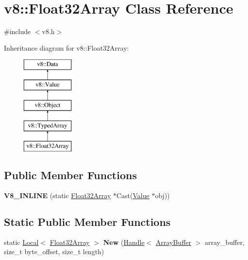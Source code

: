 \hypertarget{classv8_1_1_float32_array}{}\section{v8\+:\+:Float32\+Array Class Reference}
\label{classv8_1_1_float32_array}


{\ttfamily \#include $<$v8.\+h$>$}

Inheritance diagram for v8\+:\+:Float32\+Array\+:\begin{figure}[H]
\begin{center}
\leavevmode
\includegraphics[height=5.000000cm]{classv8_1_1_float32_array}
\end{center}
\end{figure}
\subsection*{Public Member Functions}
\begin{DoxyCompactItemize}
\item 
\hypertarget{classv8_1_1_float32_array_a954944ab47d5da9b67025ac40902a6f7}{}{\bfseries V8\+\_\+\+I\+N\+L\+I\+N\+E} (static \hyperlink{classv8_1_1_float32_array}{Float32\+Array} $\ast$Cast(\hyperlink{classv8_1_1_value}{Value} $\ast$obj))\label{classv8_1_1_float32_array_a954944ab47d5da9b67025ac40902a6f7}

\end{DoxyCompactItemize}
\subsection*{Static Public Member Functions}
\begin{DoxyCompactItemize}
\item 
\hypertarget{classv8_1_1_float32_array_a6fea1d1987ec9abce97060900d5fc4af}{}static \hyperlink{classv8_1_1_local}{Local}$<$ \hyperlink{classv8_1_1_float32_array}{Float32\+Array} $>$ {\bfseries New} (\hyperlink{classv8_1_1_handle}{Handle}$<$ \hyperlink{classv8_1_1_array_buffer}{Array\+Buffer} $>$ array\+\_\+buffer, size\+\_\+t byte\+\_\+offset, size\+\_\+t length)\label{classv8_1_1_float32_array_a6fea1d1987ec9abce97060900d5fc4af}

\end{DoxyCompactItemize}


